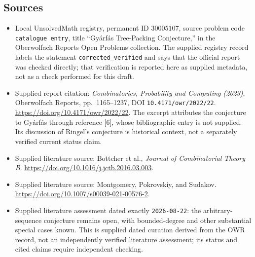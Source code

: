 \documentclass[11pt]{article}
\begin{document}
\subsection{Sources}
\begin{itemize}
\item Local UnsolvedMath registry, permanent ID \(30005107\), source problem code \texttt{catalogue entry}, title ``Gy\'arf\'as Tree-Packing Conjecture,'' in the Oberwolfach Reports Open Problems collection. The supplied registry record labels the statement \texttt{corrected\_verified} and says that the official report was checked directly; that verification is reported here as supplied metadata, not as a check performed for this draft.
\item Supplied report citation: \emph{Combinatorics, Probability and Computing (2023)}, Oberwolfach Reports, pp.~1165--1237, DOI \texttt{10.4171/owr/2022/22}. \url{https://doi.org/10.4171/owr/2022/22}. The excerpt attributes the conjecture to Gy\'arf\'as through reference [6], whose bibliographic entry is not supplied. Its discussion of Ringel's conjecture is historical context, not a separately verified current status claim.
\item Supplied literature source: Bottcher et al., \emph{Journal of Combinatorial Theory B}. \url{https://doi.org/10.1016/j.jctb.2016.03.003}.
\item Supplied literature source: Montgomery, Pokrovskiy, and Sudakov. \url{https://doi.org/10.1007/s00039-021-00576-2}.
\item Supplied literature assessment dated exactly \texttt{2026-08-22}: the arbitrary-sequence conjecture remains open, with bounded-degree and other substantial special cases known. This is supplied dated curation derived from the OWR record, not an independently verified literature assessment; its status and cited claims require independent checking.
\end{itemize}
\end{document}
